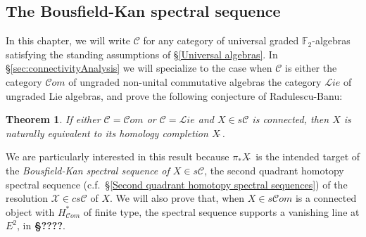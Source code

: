 \documentclass[11pt]{amsart}
\theoremstyle{plain}
\newtheorem{thm}{Theorem}[section]
\theoremstyle{definition}
\newcommand{\scrL}{\mathscr{L}}
\newcommand{\scrC}{\mathscr{C}}
\newcommand{\calX}{\mathcal{X}}
\newcommand{\calC}{\mathcal{C}}
\theoremstyle{plain}
\newcommand{\F}{\mathbb{F}}
\newcommand{\algs}{{\scrC\!\textit{om}}}
\newcommand{\liealgs}{{\scrL\!\textit{ie}}}
\newcommand{\algcat}{{\calC}}%
\newcommand{\Ftwo}{\F_2}
\begin{document}
\begin{BK spec seq}
\section{\textbf{The Bousfield-Kan spectral sequence}}\label{Bousfield-Kan spectral sequence}



In this chapter, we will write $\algcat$ for any category of universal graded $\Ftwo $-algebras satisfying the standing assumptions of \S\ref{Universal algebras}. In \S\ref{sec:connectivityAnalysis} we will specialize to the case when $\algcat$ is either the category $\algs$  of ungraded non-unital commutative algebras the category $\liealgs$ of ungraded Lie algebras, and prove the following conjecture of Radulescu-Banu:
\begin{thm}\label{completenesstheorem}
If either $\algcat=\algs$ or $\algcat=\liealgs$ and $X\in s\algcat$ is connected, then $X$ is naturally equivalent to its homology completion $X\hat{\ }$.
\end{thm}
We are particularly interested in this result because $\pi_*X\hat{\ }$ is the intended target of the \emph{Bousfield-Kan spectral sequence of $X\in s\algcat$}, the second quadrant homotopy spectral sequence (c.f.\ \S\ref{Second quadrant homotopy spectral sequences}) of the resolution $\calX\in cs\algcat$ of $X$. We will also prove that, when $X\in s\algs$ is a connected object  with $H^*_\algs$ of finite type, the spectral sequence supports a vanishing line at $E^2$, in \textbf{\S????}.




\end{BK spec seq}
\end{document}
